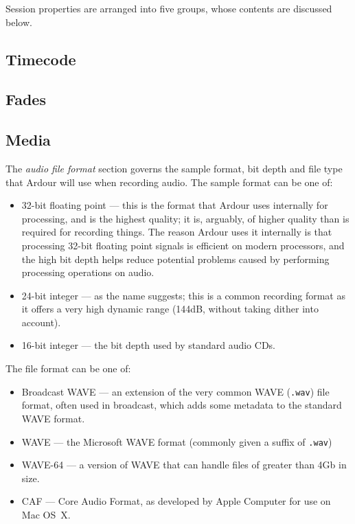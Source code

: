 \documentclass[10pt,a4paper]{book}
\begin{document}
{Session properties are arranged into five groups, whose contents are
discussed below.

\subsection{Timecode}
\label{sec:session-properties-timecode}


\subsection{Fades}
\label{sec:session-properties-fades}

\subsection{Media}
\label{sec:session-properties-media}

The \emph{audio file format} section governs the sample format, bit
depth and file type that Ardour will use when recording audio.  The
sample format can be one of:

\begin{itemize}
\item 32-bit floating point --- this is the format that Ardour uses
  internally for processing, and is the highest quality; it is,
  arguably, of higher quality than is required for recording things.
  The reason Ardour uses it internally is that processing 32-bit
  floating point signals is efficient on modern processors, and the
  high bit depth helps reduce potential problems caused by performing
  processing operations on audio.
\item 24-bit integer --- as the name suggests; this is a common
  recording format as it offers a very high dynamic range (144dB,
  without taking dither into account).
\item 16-bit integer --- the bit depth used by standard audio CDs.
\end{itemize}

The file format can be one of:

\begin{itemize}
\item Broadcast WAVE --- an extension of the very common WAVE
  (\texttt{.wav}) file format, often used in broadcast, which adds
  some metadata to the standard WAVE format.
\item WAVE --- the Microsoft WAVE format (commonly given a suffix of \texttt{.wav})
\item WAVE-64 --- a version of WAVE that can handle files of greater than 4Gb in size.
\item CAF --- Core Audio Format, as developed by Apple Computer for use on Mac OS~X.
\end{itemize}

}
\end{document}
